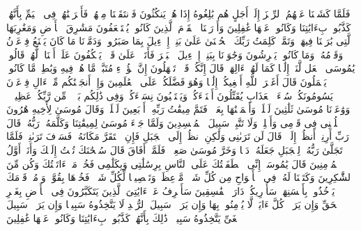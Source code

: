 \stopbuffer%
\startbuffer[\q:7:135]
فَلَمَّا كَشَفۡنَا عَنۡهُمُ ٱلرِّجۡزَ إِلَىٰۤ أَجَلٍ هُم بَٰلِغُوهُ إِذَا هُمۡ یَنكُثُونَ%
\stopbuffer%
\startbuffer[\q:7:136]
فَٱنتَقَمۡنَا مِنۡهُمۡ فَأَغۡرَقۡنَٰهُمۡ فِی ٱلۡیَمِّ بِأَنَّهُمۡ كَذَّبُوا۟ بِءَایَٰتِنَا وَكَانُوا۟ عَنۡهَا غَٰفِلِینَ%
\stopbuffer%
\startbuffer[\q:7:137]
وَأَوۡرَثۡنَا ٱلۡقَوۡمَ ٱلَّذِینَ كَانُوا۟ یُسۡتَضۡعَفُونَ مَشَٰرِقَ ٱلۡأَرۡضِ وَمَغَٰرِبَهَا ٱلَّتِی بَٰرَكۡنَا فِیهَاۖ وَتَمَّتۡ كَلِمَتُ رَبِّكَ ٱلۡحُسۡنَىٰ عَلَىٰ بَنِیۤ إِسۡرَٰۤءِیلَ بِمَا صَبَرُوا۟ۖ وَدَمَّرۡنَا مَا كَانَ یَصۡنَعُ فِرۡعَوۡنُ وَقَوۡمُهُۥ وَمَا كَانُوا۟ یَعۡرِشُونَ%
\stopbuffer%
\startbuffer[\q:7:138]
وَجَٰوَزۡنَا بِبَنِیۤ إِسۡرَٰۤءِیلَ ٱلۡبَحۡرَ فَأَتَوۡا۟ عَلَىٰ قَوۡمࣲ یَعۡكُفُونَ عَلَىٰۤ أَصۡنَامࣲ لَّهُمۡۚ قَالُوا۟ یَٰمُوسَى ٱجۡعَل لَّنَاۤ إِلَٰهࣰا كَمَا لَهُمۡ ءَالِهَةࣱۚ قَالَ إِنَّكُمۡ قَوۡمࣱ تَجۡهَلُونَ%
\stopbuffer%
\startbuffer[\q:7:139]
إِنَّ هَٰۤؤُلَاۤءِ مُتَبَّرࣱ مَّا هُمۡ فِیهِ وَبَٰطِلࣱ مَّا كَانُوا۟ یَعۡمَلُونَ%
\stopbuffer%
\startbuffer[\q:7:140]
قَالَ أَغَیۡرَ ٱللَّهِ أَبۡغِیكُمۡ إِلَٰهࣰا وَهُوَ فَضَّلَكُمۡ عَلَى ٱلۡعَٰلَمِینَ%
\stopbuffer%
\startbuffer[\q:7:141]
وَإِذۡ أَنجَیۡنَٰكُم مِّنۡ ءَالِ فِرۡعَوۡنَ یَسُومُونَكُمۡ سُوۤءَ ٱلۡعَذَابِ یُقَتِّلُونَ أَبۡنَاۤءَكُمۡ وَیَسۡتَحۡیُونَ نِسَاۤءَكُمۡۚ وَفِی ذَٰلِكُم بَلَاۤءࣱ مِّن رَّبِّكُمۡ عَظِیمࣱ%
\stopbuffer%
\startbuffer[\q:7:142]
۞ وَوَٰعَدۡنَا مُوسَىٰ ثَلَٰثِینَ لَیۡلَةࣰ وَأَتۡمَمۡنَٰهَا بِعَشۡرࣲ فَتَمَّ مِیقَٰتُ رَبِّهِۦۤ أَرۡبَعِینَ لَیۡلَةࣰۚ وَقَالَ مُوسَىٰ لِأَخِیهِ هَٰرُونَ ٱخۡلُفۡنِی فِی قَوۡمِی وَأَصۡلِحۡ وَلَا تَتَّبِعۡ سَبِیلَ ٱلۡمُفۡسِدِینَ%
\stopbuffer%
\startbuffer[\q:7:143]
وَلَمَّا جَاۤءَ مُوسَىٰ لِمِیقَٰتِنَا وَكَلَّمَهُۥ رَبُّهُۥ قَالَ رَبِّ أَرِنِیۤ أَنظُرۡ إِلَیۡكَۚ قَالَ لَن تَرَىٰنِی وَلَٰكِنِ ٱنظُرۡ إِلَى ٱلۡجَبَلِ فَإِنِ ٱسۡتَقَرَّ مَكَانَهُۥ فَسَوۡفَ تَرَىٰنِیۚ فَلَمَّا تَجَلَّىٰ رَبُّهُۥ لِلۡجَبَلِ جَعَلَهُۥ دَكࣰّا وَخَرَّ مُوسَىٰ صَعِقࣰاۚ فَلَمَّاۤ أَفَاقَ قَالَ سُبۡحَٰنَكَ تُبۡتُ إِلَیۡكَ وَأَنَا۠ أَوَّلُ ٱلۡمُؤۡمِنِینَ%
\stopbuffer%
\startbuffer[\q:7:144]
قَالَ یَٰمُوسَىٰۤ إِنِّی ٱصۡطَفَیۡتُكَ عَلَى ٱلنَّاسِ بِرِسَٰلَٰتِی وَبِكَلَٰمِی فَخُذۡ مَاۤ ءَاتَیۡتُكَ وَكُن مِّنَ ٱلشَّٰكِرِینَ%
\stopbuffer%
\startbuffer[\q:7:145]
وَكَتَبۡنَا لَهُۥ فِی ٱلۡأَلۡوَاحِ مِن كُلِّ شَیۡءࣲ مَّوۡعِظَةࣰ وَتَفۡصِیلࣰا لِّكُلِّ شَیۡءࣲ فَخُذۡهَا بِقُوَّةࣲ وَأۡمُرۡ قَوۡمَكَ یَأۡخُذُوا۟ بِأَحۡسَنِهَاۚ سَأُو۟رِیكُمۡ دَارَ ٱلۡفَٰسِقِینَ%
\stopbuffer%
\startbuffer[\q:7:146]
سَأَصۡرِفُ عَنۡ ءَایَٰتِیَ ٱلَّذِینَ یَتَكَبَّرُونَ فِی ٱلۡأَرۡضِ بِغَیۡرِ ٱلۡحَقِّ وَإِن یَرَوۡا۟ كُلَّ ءَایَةࣲ لَّا یُؤۡمِنُوا۟ بِهَا وَإِن یَرَوۡا۟ سَبِیلَ ٱلرُّشۡدِ لَا یَتَّخِذُوهُ سَبِیلࣰا وَإِن یَرَوۡا۟ سَبِیلَ ٱلۡغَیِّ یَتَّخِذُوهُ سَبِیلࣰاۚ ذَٰلِكَ بِأَنَّهُمۡ كَذَّبُوا۟ بِءَایَٰتِنَا وَكَانُوا۟ عَنۡهَا غَٰفِلِینَ%
\stopbuffer%
